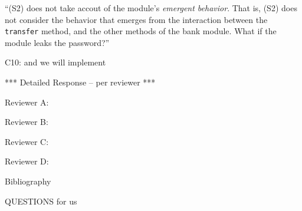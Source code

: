 ``(S2) does not take accout of the module's \emph{emergent behavior}. That is, (S2) does not consider the behavior that emerges from the interaction between the 
\texttt{transfer} method, and the other methods of the bank module. What if the module leaks the password?''

 
C10: and we will implement
 


*** Detailed Response -- per reviewer ***

Reviewer A:

Reviewer B:

Reviewer C:

Reviewer D:

Bibliography



QUESTIONS for us